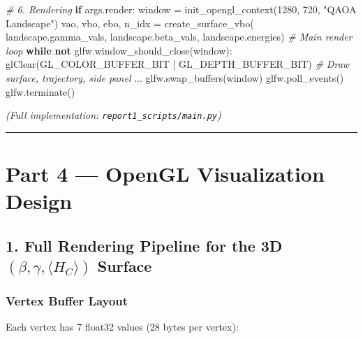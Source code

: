 \documentclass[
  11pt,
]{report}
\newenvironment{Shaded}{}{}
\newcommand{\CommentTok}[1]{\textcolor[rgb]{0.38,0.63,0.69}{\textit{#1}}}
\newcommand{\ControlFlowTok}[1]{\textcolor[rgb]{0.00,0.44,0.13}{\textbf{#1}}}
\newcommand{\DecValTok}[1]{\textcolor[rgb]{0.25,0.63,0.44}{#1}}
\newcommand{\KeywordTok}[1]{\textcolor[rgb]{0.00,0.44,0.13}{\textbf{#1}}}
\newcommand{\NormalTok}[1]{#1}
\newcommand{\OperatorTok}[1]{\textcolor[rgb]{0.40,0.40,0.40}{#1}}
\newcommand{\StringTok}[1]{\textcolor[rgb]{0.25,0.44,0.63}{#1}}
\begin{document}
\begin{Shaded}
\begin{Highlighting}[]
    \CommentTok{\# 6. Rendering}
    \ControlFlowTok{if}\NormalTok{ args.render:}
\NormalTok{        window }\OperatorTok{=}\NormalTok{ init\_opengl\_context(}\DecValTok{1280}\NormalTok{, }\DecValTok{720}\NormalTok{, }\StringTok{"QAOA Landscape"}\NormalTok{)}
\NormalTok{        vao, vbo, ebo, n\_idx }\OperatorTok{=}\NormalTok{ create\_surface\_vbo(}
\NormalTok{            landscape.gamma\_vals, landscape.beta\_vals, landscape.energies)}
        \CommentTok{\# Main render loop}
        \ControlFlowTok{while} \KeywordTok{not}\NormalTok{ glfw.window\_should\_close(window):}
\NormalTok{            glClear(GL\_COLOR\_BUFFER\_BIT }\OperatorTok{|}\NormalTok{ GL\_DEPTH\_BUFFER\_BIT)}
            \CommentTok{\# Draw surface, trajectory, side panel}
\NormalTok{            ...}
\NormalTok{            glfw.swap\_buffers(window)}
\NormalTok{            glfw.poll\_events()}
\NormalTok{        glfw.terminate()}
\end{Highlighting}
\end{Shaded}

\emph{(Full implementation: \texttt{report1\_scripts/main.py})}

\begin{center}\rule{0.5\linewidth}{0.5pt}\end{center}

\section{Part 4 --- OpenGL Visualization
Design}\label{part-4-opengl-visualization-design}

\subsection{\texorpdfstring{1. Full Rendering Pipeline for the 3D
\((\beta, \gamma, \langle H_C \rangle)\)
Surface}{1. Full Rendering Pipeline for the 3D (\textbackslash beta, \textbackslash gamma, \textbackslash langle H\_C \textbackslash rangle) Surface}}\label{full-rendering-pipeline-for-the-3d-beta-gamma-langle-h_c-rangle-surface}

\subsubsection{Vertex Buffer Layout}\label{vertex-buffer-layout}

Each vertex has 7 float32 values (28 bytes per vertex):
\end{document}
